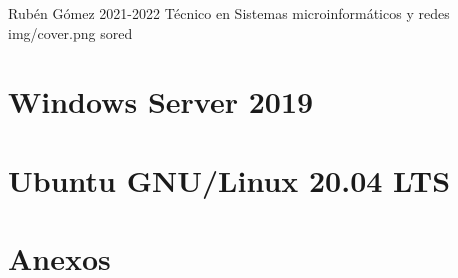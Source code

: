 \documentclass{../../../yukibook.cls/yukibook}
\begin{document}
  {Rubén Gómez}  %
  {2021-2022}    %
  {Técnico en Sistemas microinformáticos y redes} %
  {}	%
  {}	%
  {img/cover.png} %
  {sored} %

\part{Windows Server 2019}
\graphicspath{{img/windows/}}


\part{Ubuntu GNU/Linux 20.04 LTS}
\graphicspath{{img/linux/}}


\part{Anexos}

\graphicspath{{../../../anexos/instalar_ubuntu_lts/}}


\graphicspath{{../../../anexos/ubuntu_raid1/}}


\graphicspath{{../../../anexos/gestion_backups/}}


\graphicspath{{../../../anexos/sistemas_monitorizacion/}}


\graphicspath{{../../../anexos/monitorizacion_munin/}}


\graphicspath{{../../../anexos/virtualbox_networking/}}


\graphicspath{{../../../anexos/}}

\end{document}

